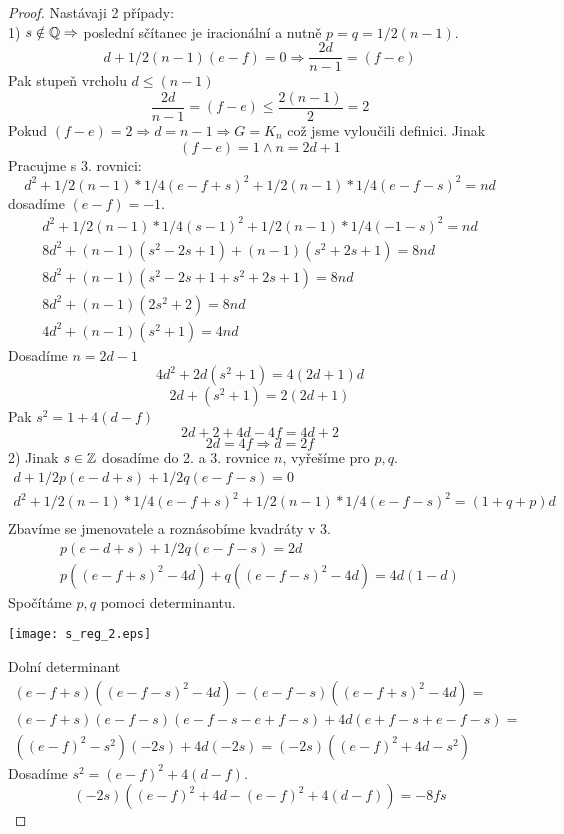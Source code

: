 \begin{proof}
	Nastávaji 2 případy:\\
	1) $s \notin \operatorname{\mathbb{Q}} \Rightarrow$ poslední sčítanec je iracionální a nutně $ p = q = 1/2 (n - 1)$.
	\[ d + 1/2 (n-1) (e - f) = 0 \Rightarrow \frac{2d}{n - 1} = (f - e) \]
	Pak stupeň vrcholu $ d \leq (n - 1)$
	\[ \frac{2d}{n - 1} = (f - e) \leq \frac{2 (n-1)}{2} = 2 \]
	Pokud $(f - e) = 2 \Rightarrow d = n-1 \Rightarrow G = K_n$ což jsme vyloučili definici. Jinak
	\[(f - e) = 1 \land n = 2d + 1 \]
	Pracujme s 3. rovnici:
	\[ d^2 + 1/2 (n-1) * 1/4 (e - f + s)^2 + 1/2 (n-1) * 1/4 (e - f -s)^2 = nd \]
	dosadíme $(e - f) = -1$.
	\begin{equation*}
	\begin{aligned}
	 d^2 + 1/2 (n-1) * 1/4 (s - 1)^2 + 1/2 (n-1) * 1/4 (-1 - s)^2 = nd \\
	 8d^2 + (n-1)(s^2 - 2s + 1) + (n-1)(s^2 + 2s + 1) = 8nd \\
	 8d^2 + (n-1)(s^2 - 2s + 1 + s^2 + 2s + 1) = 8nd \\
	 8d^2 + (n-1)(2s^2 + 2) = 8nd \\
	 4d^2 + (n-1)(s^2 + 1) = 4nd
	\end{aligned}
	\end{equation*}
	Dosadíme $n = 2d - 1$
	\[ 4d^2 + 2d(s^2 + 1) = 4(2d + 1)d \]
	\[ 2d + (s^2 + 1) = 2(2d + 1) \]
	Pak $s^2 = 1 + 4(d - f)$
	\[ 2d + 2 + 4d - 4f = 4d + 2 \]
	\[ 2d = 4f \Rightarrow d = 2f \]
	2) Jinak $s \in \operatorname{\mathbb{Z}}$ dosadíme do 2. a 3. rovnice $n$, vyřešíme pro $p,q$.
	\begin{equation*}
	\begin{aligned}
		d + 1/2 p (e - d + s) + 1/2 q (e - f - s) = 0 \\
		d^2 + 1/2 (n-1) * 1/4 (e - f + s)^2 + 1/2 (n-1) * 1/4 (e - f -s)^2 = (1 + q + p)d \\
	\end{aligned}
	\end{equation*}
	Zbavíme se jmenovatele a roznásobíme kvadráty v 3.
	\begin{equation*}
	\begin{aligned}
		p (e - d + s) + 1/2 q (e - f - s) = 2d \\
		p((e - f + s)^2 - 4d) + q((e - f -s)^2 - 4d) = 4d (1 - d)
	\end{aligned}
	\end{equation*}
	Spočítáme $p,q$ pomoci determinantu.

	\texttt{[image: s\_reg\_2.eps]}

	Dolní determinant
	\begin{equation*}
	\begin{split}
		(e - f + s)((e - f - s)^2 -4d) - (e - f - s)((e - f + s)^2 - 4d) = \\
		(e - f + s)(e - f - s)(e - f -s - e + f - s) + 4d (e + f - s + e - f - s) = \\
		((e - f)^2 - s^2)(-2s) + 4d (-2s) = (-2s)((e - f)^2 + 4d - s^2)
	\end{split}
	\end{equation*}
	Dosadíme $s^2 = (e - f)^2 + 4(d - f)$.
	\[ (-2s)((e - f)^2 + 4d - (e - f)^2 + 4(d - f)) = -8fs \]


\end{proof}
